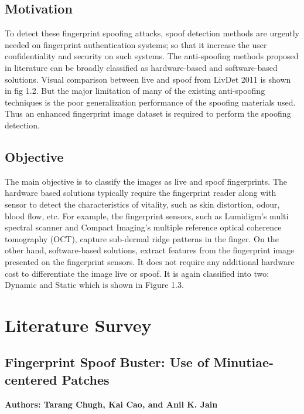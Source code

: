 \section{Motivation} To detect these  fingerprint spoofing attacks, spoof detection methods are urgently needed on fingerprint authentication systems; so that it increase the user confidentiality and security on such systems. The anti-spoofing methods proposed in literature can be broadly classified as hardware-based and software-based solutions. Visual comparison between live and spoof from LivDet 2011 is shown in fig 1.2. But the major limitation of many of the existing anti-spoofing techniques is the poor generalization performance of the spoofing materials used. Thus an enhanced fingerprint image dataset is required to perform the spoofing detection.

\section{Objective}
The main objective is to classify the images as live and spoof fingerprints.
The hardware based solutions typically require the fingerprint reader along with sensor to detect the characteristics of vitality, such as skin distortion, odour, blood ﬂow, etc. For example, the fingerprint sensors, such as Lumidigm’s multi spectral scanner and Compact Imaging’s multiple reference optical coherence tomography (OCT), capture sub-dermal ridge patterns in the finger. On the other hand, software-based solutions, extract features from the fingerprint image presented on the fingerprint sensors. It does not require any additional hardware cost to differentiate the image live or spoof. It is again classified into two: Dynamic and Static which is shown in Figure 1.3.

\chapter{Literature Survey}
\section{Fingerprint Spoof Buster: Use of Minutiae-centered Patches}
\textbf{Authors: Tarang Chugh, Kai Cao, and Anil K. Jain}
